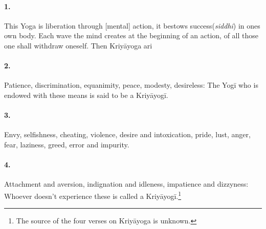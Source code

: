 \begin{otherlanguage}{english}
\begin{tlate}
\paragraph{1.} This Yoga is liberation through [mental] action, it bestows success(\textit{siddhi}) in ones own body. Each wave the mind creates at the beginning of an action, of all those one shall withdraw oneself. Then Kriyāyoga ari
\paragraph{2.} Patience, discrimination, equanimity, peace, modesty, desireless: The Yogī who is endowed with these means is said to be a Kriyāyogī. 
\paragraph{3.} Envy, selfishness, cheating, violence, desire and intoxication, pride, lust, anger, fear, laziness, greed, error and impurity. 
\paragraph{4.} Attachment and aversion, indignation and idleness, impatience and dizzyness: Whoever doesn't experience these is called a Kriyāyogī.\footnote{The source of the four verses on Kriyāyoga is unknown.} \bigskip \bigskip


\end{tlate}
\end{otherlanguage}

